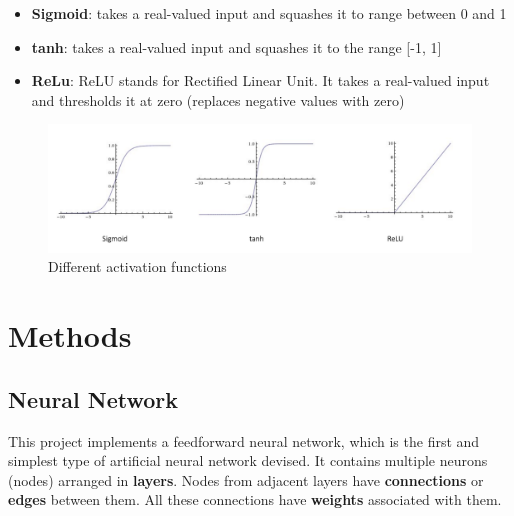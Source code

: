 \documentclass{article}
\begin{document}
\begin{itemize}
  \item \textbf{Sigmoid}: takes a real-valued input and squashes it to range between 0 and 1
  \item \textbf{tanh}: takes a real-valued input and squashes it to the range [-1, 1]
  \item \textbf{ReLu}: ReLU stands for Rectified Linear Unit. It takes a real-valued input and thresholds it at zero (replaces negative values with zero)
\end{itemize}

\begin{figure}[!h]
	\centering
		\includegraphics[width=\columnwidth]{images/activation-functions.png}
		\caption{Different activation functions}\label{activation-functions}
	\label{fig:graph}
\end{figure}

\section{Methods}

\subsection{Neural Network}

This project implements a feedforward neural network, which is the first and simplest type of artificial neural network devised. It contains multiple neurons (nodes) arranged in \textbf{layers}. Nodes from adjacent layers have \textbf{connections} or \textbf{edges} between them. All these connections have \textbf{weights} associated with them.
\end{document}
